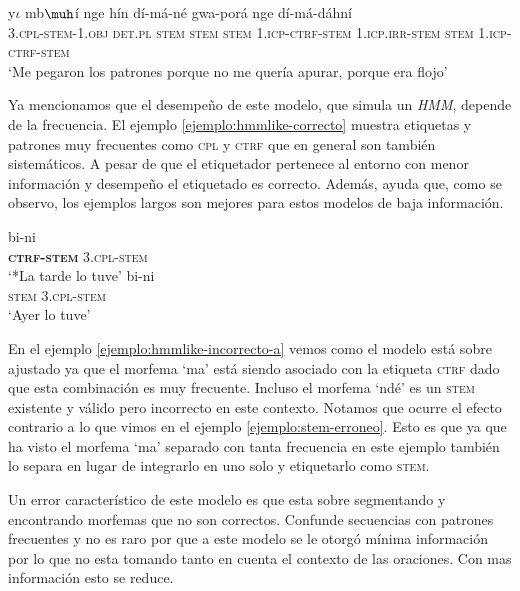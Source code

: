 \documentclass[letterpaper,12pt,oneside]{book}
\theoremstyle{definition}
\begin{document}
\begin{exe} 
    \ex 
     {y$\iota$} {mb$\muh$í} {nge} {hín} {dí-má-né} {gwa-porá} {nge} {dí-má-dáhní}\\
    {\textsc{3.cpl-stem-1.obj}} {\textsc{det.pl}} {\textsc{stem}} {\textsc{stem}} {\textsc{stem}} {\textsc{1.icp-ctrf-stem}} {\textsc{1.icp.irr-stem}} {\textsc{stem}} {\textsc{1.icp-ctrf-stem}}\\
    \trans `Me pegaron los patrones porque no me quería apurar, porque era flojo'
    \label{ejemplo:hmmlike-correcto}
\end{exe} 

Ya mencionamos que el desempeño de este modelo, que simula un \textit{HMM}, depende de la frecuencia. El ejemplo \ref{ejemplo:hmmlike-correcto} muestra etiquetas y patrones muy frecuentes como \textsc{cpl} y \textsc{ctrf} que en general son también sistemáticos. A pesar de que el etiquetador pertenece al entorno con menor información y desempeño el etiquetado es correcto. Además, ayuda que, como se observo, los ejemplos largos son mejores para estos modelos de baja información.

\begin{exe}
    \ex \begin{xlist}
        \ex {} {bi-ni}\\
        {\textbf{\textsc{ctrf-stem}}} {\textsc{3.cpl-stem}}\\
        \trans `*La tarde lo tuve' \label{ejemplo:hmmlike-incorrecto-a}
        \ex {} {bi-ni}\\
        {\textsc{stem}} {\textsc{3.cpl-stem}}\\
        \trans `Ayer lo tuve' \label{ejemplo:hmmlike-incorrecto-b}
        \end{xlist}
\end{exe}

En el ejemplo \ref{ejemplo:hmmlike-incorrecto-a} vemos como el modelo está sobre ajustado ya que el morfema `ma' está siendo asociado con la etiqueta \textsc{ctrf} dado que esta combinación es muy frecuente. Incluso el morfema `ndé' es un \textsc{stem} existente y válido pero incorrecto en este contexto. Notamos que ocurre el efecto contrario a lo que vimos en el ejemplo \ref{ejemplo:stem-erroneo}. Esto es que ya que ha visto el morfema `ma' separado con tanta frecuencia en este ejemplo también lo separa en lugar de integrarlo en uno solo y etiquetarlo como \textsc{stem}.

Un error característico de este modelo es que esta sobre segmentando y encontrando morfemas que no son correctos. Confunde secuencias con patrones frecuentes y no es raro por que a este modelo se le otorgó mínima información por lo que no esta tomando tanto en cuenta el contexto de las oraciones. Con mas información esto se reduce.
\end{document}
